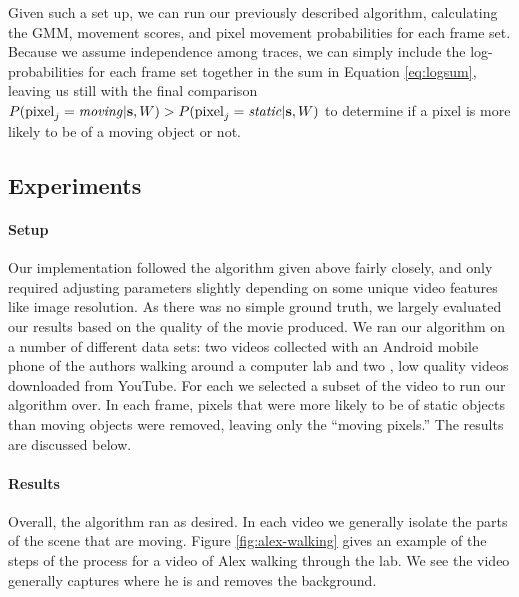 Given such a set up, we can run our previously described algorithm, calculating
the GMM, movement scores, and pixel movement probabilities for each frame set.
Because we assume independence among traces, we can simply include the
log-probabilities for each frame set together in the sum in Equation
\eqref{eq:logsum}, leaving us still with the final comparison $P({\rm pixel}_j
= {\it moving}|{\bf s},W) > P({\rm pixel}_j = {\it static}|{\bf s},W)$ to
determine if a pixel is more likely to be of a moving object or not.





\subsection{Experiments} %
\label{sub:Experiments}


\paragraph{Setup} %
Our implementation followed the algorithm given above fairly closely, and only
required adjusting parameters slightly depending on some unique video features
like image resolution.  As there was no simple ground truth, we largely
evaluated our results based on the quality of the movie produced.  We ran our
algorithm on a number of different data sets: two videos collected with an Android
mobile phone of the authors walking around a computer lab and two
, low quality videos downloaded from YouTube.  For each we
selected a subset of the video to run our algorithm over.  In each frame,
pixels that were more likely to be of static objects than moving objects were
removed, leaving only the ``moving pixels.''  The results are discussed below.



\paragraph{Results} %
\label{par:Results}

Overall, the algorithm ran as desired.  In each video we generally isolate the
parts of the scene that are moving.  Figure \ref{fig:alex-walking} gives an
example of the steps of the process for a video of Alex walking through the
lab.  We see the video generally captures where he is and removes the
background.

